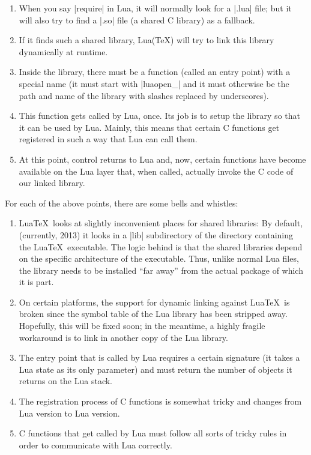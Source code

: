 \begin{enumerate}
\item When you say |require| in Lua, it will normally look for a
  |.lua| file; but it will also try to find a |.so| file (a shared C
  library) as a fallback.
\item If it finds such a shared library, Lua(\TeX) will try to link
  this library dynamically at runtime.
\item Inside the library, there must be a function (called an entry
  point) with a special name (it must start with |luaopen_| and it
  must otherwise be the path and name of the library with slashes replaced by
  underscores).
\item This function gets called by Lua, once. Its job is to setup the
  library so that it can be used by Lua. Mainly, this means that
  certain C functions get registered in such a way that Lua can call
  them.
\item At this point, control returns to Lua and, now, certain
  functions have become available on the Lua layer that, when called,
  actually invoke the C code of our linked library.
\end{enumerate}

For each of the above points, there are some bells and whistles:

\begin{enumerate}
\item Lua\TeX\ looks at slightly inconvenient places for shared
  libraries: By default, (currently, 2013) it looks in a |lib|
  subdirectory of the directory containing the Lua\TeX\
  executable. The logic behind is that the shared libraries depend on
  the specific architecture of the executable. Thus, unlike normal Lua
  files, the library needs to be installed ``far away'' from the actual
  package of which it is part.
\item On certain platforms, the support for dynamic linking against
  Lua\TeX\ is broken since the symbol table of the Lua library has been
  stripped away. Hopefully, this will be fixed soon; in the meantime, a
  highly fragile workaround is to link in another copy of the Lua
  library.
\item The entry point that is called by Lua requires a certain
  signature (it takes a Lua state as its only parameter) and must
  return the number of objects it returns on the Lua stack.
\item The registration process of C functions is somewhat tricky and
  changes from Lua version to Lua version.
\item C functions that get called by Lua must follow all sorts of
  tricky rules in order to communicate with Lua correctly.
\end{enumerate}

